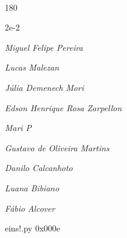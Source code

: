 \documentclass[12pt]{article}
\begin{document}

\pagebreak			

	\ 
	\vfill
	\begin{turn}{180}	
		\begin{minipage}{\textwidth}
		  	\ttfamily %
			\centering
			{\Huge 2e-2}
		  
			\hfill
		  
			

\textit{\small Miguel Felipe Pereira}

\textit{\small Lucas Malezan}

\textit{\small Júlia Demenech Mori}

\textit{\small Edson Henrique Rosa Zarpellon}

\textit{\small Mari P}

\textit{\small Gustavo de Oliveira Martins}

\textit{\small Danilo Calcanhoto}

\textit{\small Luana Bibiano}

\textit{\small Fábio Alcover}

\bigskip

eins!.py
0x000e


		\end{minipage}	
	\end{turn}
	\vfill
	\

\pagebreak
\end{document}
